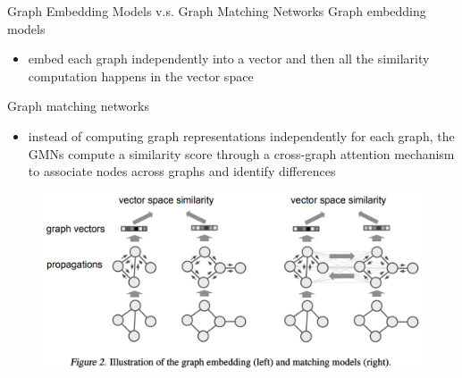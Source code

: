 \documentclass{beamer}
\begin{document}
\begin{frame}{Graph Embedding Models v.s. Graph Matching Networks}
Graph embedding models
\begin{itemize}
\item embed each graph independently into a vector and then all the similarity computation happens in the vector space
\end{itemize}

Graph matching networks
\begin{itemize}
\item instead of computing graph representations independently for each graph, the GMNs compute a similarity score through a cross-graph attention mechanism to associate nodes across graphs and identify differences
\end{itemize}

\begin{figure}[h]
\centering
\includegraphics[height=0.4\textheight]{pic/GMN/gmn_fig2.png}
\end{figure}
\end{frame}
\end{document}
